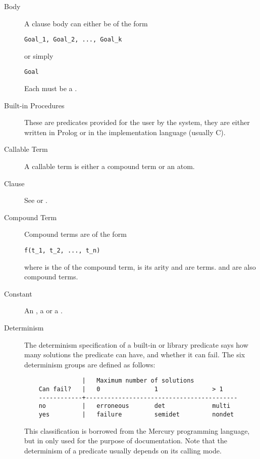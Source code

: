 \begin{description}
\item[Body]
A clause body can either be of the form
\begin{verbatim}
Goal_1, Goal_2, ..., Goal_k
\end{verbatim}
or simply
\begin{verbatim}
Goal
\end{verbatim}
Each  must be a .

\item[Built-in Procedures]
These are predicates provided for the user by the
{\eclipse} system, they are either written in Prolog or in the implementation
language (usually C).

\item[Callable Term]
A callable term is either a compound term or an atom.

\item[Clause]
See  or .

\item[Compound Term]
Compound terms are of the form
\begin{verbatim}
f(t_1, t_2, ..., t_n)
\end{verbatim}
where  is the  of the compound term,  is its
arity and  are terms.
 and  are also compound terms.

\item[Constant]
An , a  or a .

\item[Determinism]
The determinism specification of a built-in or library predicate says
how many solutions the predicate can have, and whether it can fail.
The six determinism groups are defined as follows:
\begin{verbatim}
                |   Maximum number of solutions
    Can fail?   |   0               1               > 1
    ------------+------------------------------------------
    no          |   erroneous       det             multi
    yes         |   failure         semidet         nondet
\end{verbatim}
This classification is borrowed from the Mercury programming language,
but in {\eclipse} only used for the purpose of documentation.
Note that the determinism of a predicate usually depends on its calling mode.


\end{description}

